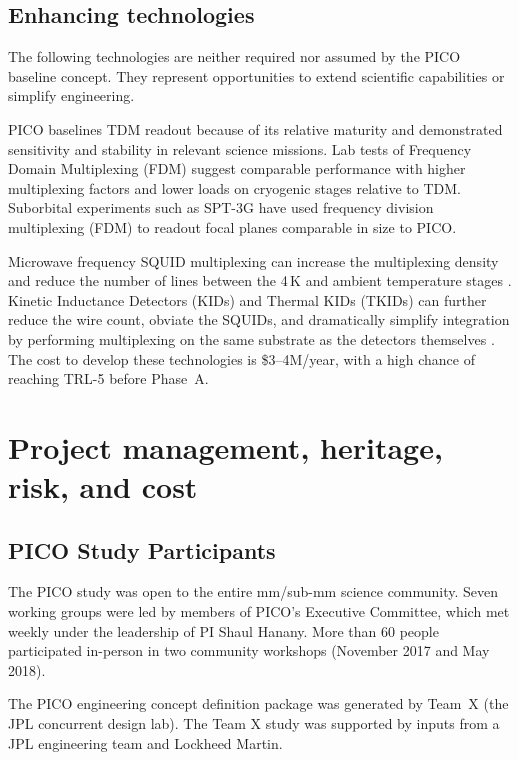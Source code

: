 \subsection{Enhancing technologies}
\label{sec:enhancing_technologies} %

The following technologies are neither required nor assumed by the
PICO baseline concept. They represent opportunities to extend
scientific capabilities or simplify engineering.

PICO baselines TDM readout because of its relative maturity and
demonstrated sensitivity and stability in relevant science
missions. Lab tests of Frequency Domain Multiplexing (FDM) suggest
comparable performance with higher multiplexing factors and lower
loads on cryogenic stages relative to TDM. Suborbital experiments such
as SPT-3G have used frequency division multiplexing (FDM) to readout
focal planes comparable in size to PICO.

Microwave frequency SQUID multiplexing can increase the multiplexing
density and reduce the number of lines between the 4\,K and ambient
temperature stages \citep{Dober2017,Irwin2004}. Kinetic Inductance
Detectors (KIDs) and Thermal KIDs (TKIDs) can further reduce the wire
count, obviate the SQUIDs, and dramatically simplify integration by
performing multiplexing on the same substrate as the detectors
themselves \citep{McCarrick2016,Steinbach2018}. The cost to develop
these technologies is \$3--4M/year, with a high chance of reaching
TRL-5 before Phase~A.
\costfootnote

\bigskip
\section{Project management, heritage, risk, and cost}
\label{sec:project_management} %

\subsection{PICO Study Participants}
\label{sec:study_participants} %

The PICO study was open to the entire mm/sub-mm science community. 
Seven working groups were led by
members of PICO's Executive Committee, which met weekly under the
leadership of PI Shaul Hanany. More than 60 people participated
in-person in two community workshops (November 2017 and May 2018).

The PICO engineering concept definition package was generated by
Team~X (the JPL concurrent design lab). The Team X study was supported
by inputs from a JPL engineering team and Lockheed Martin.

